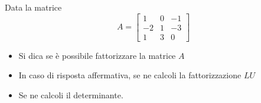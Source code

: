 Data la matrice
\bigskip
\[
A=\left[
\begin{array}{ccc}
1 & 0 & -1 \\
-2 & 1 & -3\\
1 & 3 & 0
\end{array}\right]
\]

\begin{itemize}
\item Si dica se \`e possibile fattorizzare la matrice $A$
\item In caso di risposta affermativa, se ne calcoli la fattorizzazione $LU$
\item Se ne calcoli il determinante.
\end{itemize}
